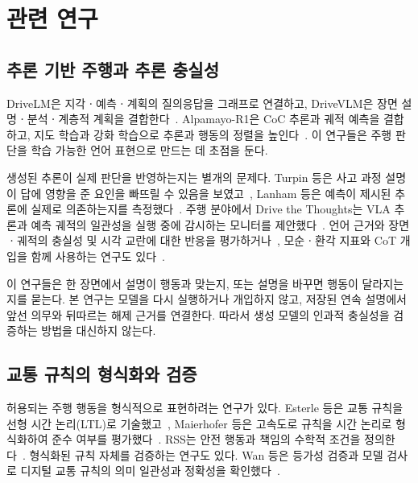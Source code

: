 \section{관련 연구}
\label{sec:related}

\begin{revision}

\subsection{추론 기반 주행과 추론 충실성}
\label{sec:related-reasoning}

DriveLM은 지각ㆍ예측ㆍ계획의 질의응답을 그래프로 연결하고, DriveVLM은 장면 설명ㆍ분석ㆍ계층적 계획을 결합한다~\cite{sima2024drivelm,tian2024drivevlm}. Alpamayo-R1은 CoC 추론과 궤적 예측을 결합하고, 지도 학습과 강화 학습으로 추론과 행동의 정렬을 높인다~\cite{wang2025alpamayo}. 이 연구들은 주행 판단을 학습 가능한 언어 표현으로 만드는 데 초점을 둔다.

생성된 추론이 실제 판단을 반영하는지는 별개의 문제다. Turpin 등은 사고 과정 설명이 답에 영향을 준 요인을 빠뜨릴 수 있음을 보였고~\cite{turpin2023}, Lanham 등은 예측이 제시된 추론에 실제로 의존하는지를 측정했다~\cite{lanham2023}. 주행 분야에서 Drive the Thoughts는 VLA 추론과 예측 궤적의 일관성을 실행 중에 감시하는 모니터를 제안했다~\cite{yu2026drivethoughts}. 언어 근거와 장면ㆍ궤적의 충실성 및 시각 교란에 대한 반응을 평가하거나~\cite{mayumu2026faithfulness}, 모순ㆍ환각 지표와 CoT 개입을 함께 사용하는 연구도 있다~\cite{nguyen2026vladrivebench}.

이 연구들은 한 장면에서 설명이 행동과 맞는지, 또는 설명을 바꾸면 행동이 달라지는지를 묻는다. 본 연구는 모델을 다시 실행하거나 개입하지 않고, 저장된 연속 설명에서 앞선 의무와 뒤따르는 해제 근거를 연결한다. 따라서 생성 모델의 인과적 충실성을 검증하는 방법을 대신하지 않는다.

\subsection{교통 규칙의 형식화와 검증}
\label{sec:related-rules}

허용되는 주행 행동을 형식적으로 표현하려는 연구가 있다. Esterle 등은 교통 규칙을 선형 시간 논리(LTL)로 기술했고~\cite{esterle2020}, Maierhofer 등은 고속도로 규칙을 시간 논리로 형식화하여 준수 여부를 평가했다~\cite{maierhofer2020}. RSS는 안전 행동과 책임의 수학적 조건을 정의한다~\cite{shalev2017rss}. 형식화된 규칙 자체를 검증하는 연구도 있다. Wan 등은 등가성 검증과 모델 검사로 디지털 교통 규칙의 의미 일관성과 정확성을 확인했다~\cite{wan2024}.


\end{revision}
